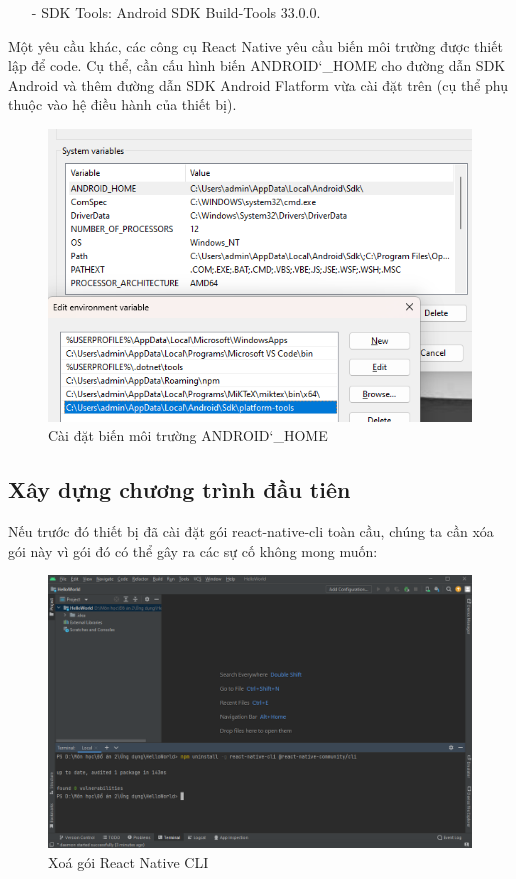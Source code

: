 \begin{enumerate}
\begin{enumerate}
        \item[-] SDK Tools: Android SDK Build-Tools 33.0.0.
    \end{enumerate}
    Một yêu cầu khác, các công cụ React Native yêu cầu biến môi trường được thiết lập để code. Cụ thể, cần cấu hình biến ANDROID\char`_HOME cho đường dẫn SDK Android và thêm đường dẫn SDK Android Flatform vừa cài đặt trên (cụ thể phụ thuộc vào hệ điều hành của thiết bị).
    \begin{figure}[!ht]
        \centering
        \includegraphics[scale=0.5]{images/configVariable.png}
        \caption{Cài đặt biến môi trường ANDROID\char`_HOME}
    \end{figure}
\end{enumerate}

\subsection{Xây dựng chương trình đầu tiên}
Nếu trước đó thiết bị đã cài đặt gói react-native-cli toàn cầu, chúng ta cần xóa gói này vì gói đó có thể gây ra các sự cố không mong muốn:
\begin{figure}[!ht]
    \centering
    \includegraphics[scale=0.5]{images/deleteReactnativeCLI.png}
    \caption{Xoá gói React Native CLI}
\end{figure}

